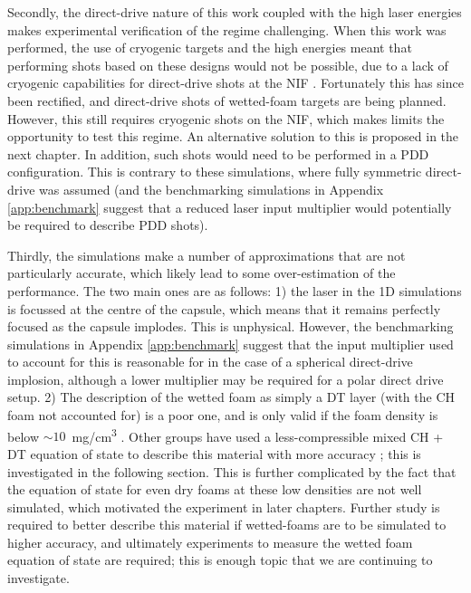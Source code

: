 Secondly, the direct-drive nature of this work coupled with the high laser energies makes experimental verification of the regime challenging. When this work was performed, the use of cryogenic targets and the high energies meant that performing shots based on these designs would not be possible, due to a lack of cryogenic capabilities for direct-drive shots at the NIF \cite{Hohenberger2015}. Fortunately this has since been rectified, and direct-drive shots of wetted-foam targets are being planned. However, this still requires cryogenic shots on the NIF, which makes limits the opportunity to test this regime. An alternative solution to this is proposed in the next chapter. In addition, such shots would need to be performed in a PDD configuration. This is contrary to these simulations, where fully symmetric direct-drive was assumed (and the benchmarking simulations in Appendix \ref{app:benchmark} suggest that a reduced laser input multiplier would potentially be required to describe PDD shots).

Thirdly, the simulations make a number of approximations that are not particularly accurate, which likely lead to some over-estimation of the performance. The two main ones are as follows: 1) the laser in the 1D simulations is focussed at the centre of the capsule, which means that it remains perfectly focused as the capsule implodes. This is unphysical. However, the benchmarking simulations in Appendix \ref{app:benchmark} suggest that the input multiplier used to account for this is reasonable for in the case of a spherical direct-drive implosion, although a lower multiplier may be required for a polar direct drive setup. 2) The description of the wetted foam as simply a DT layer (with the CH foam not accounted for) is a poor one, and is only valid if the foam density is below $\sim10$~\si[per-mode=symbol]{\milli\gram\per\centi\meter\cubed} \cite{CHFoamLim}. Other groups have used a less-compressible mixed CH + DT equation of state to describe this material with more accuracy \cite{Olson2021}; this is investigated in the following section. This is further complicated by the fact that the equation of state for even dry foams at these low densities are not well simulated, which motivated the experiment in later chapters. Further study is required to better describe this material if wetted-foams are to be simulated to higher accuracy, and ultimately experiments to measure the wetted foam equation of state are required; this is enough topic that we are continuing to investigate.

